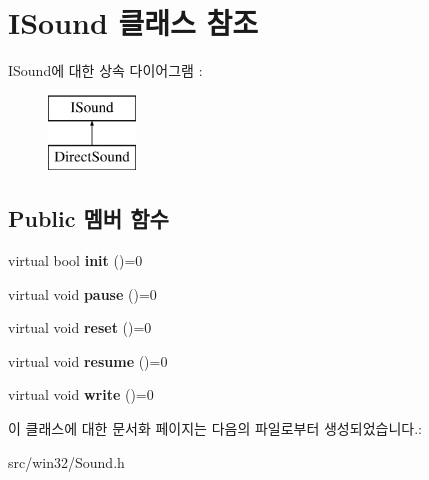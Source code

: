 \hypertarget{class_i_sound}{}\section{I\+Sound 클래스 참조}
\label{class_i_sound}
I\+Sound에 대한 상속 다이어그램 \+: \begin{figure}[H]
\begin{center}
\leavevmode
\includegraphics[height=2.000000cm]{class_i_sound}
\end{center}
\end{figure}
\subsection*{Public 멤버 함수}
\begin{DoxyCompactItemize}
\item 
\mbox{\label{class_i_sound_ac14f05f2d5050cfefa4133099d9f656e}} 
virtual bool {\bfseries init} ()=0
\item 
\mbox{\label{class_i_sound_a9fb848e0e31ab8bcd5384b0422855c3d}} 
virtual void {\bfseries pause} ()=0
\item 
\mbox{\label{class_i_sound_a7ca59c529f3abce2dd4ed8d8da243c5e}} 
virtual void {\bfseries reset} ()=0
\item 
\mbox{\label{class_i_sound_a8e0adea68f52a7f0392a3988a558aaf0}} 
virtual void {\bfseries resume} ()=0
\item 
\mbox{\label{class_i_sound_ad7913f5fa003c06e8e1a930f760d20e2}} 
virtual void {\bfseries write} ()=0
\end{DoxyCompactItemize}


이 클래스에 대한 문서화 페이지는 다음의 파일로부터 생성되었습니다.\+:\begin{DoxyCompactItemize}
\item 
src/win32/Sound.\+h\end{DoxyCompactItemize}
